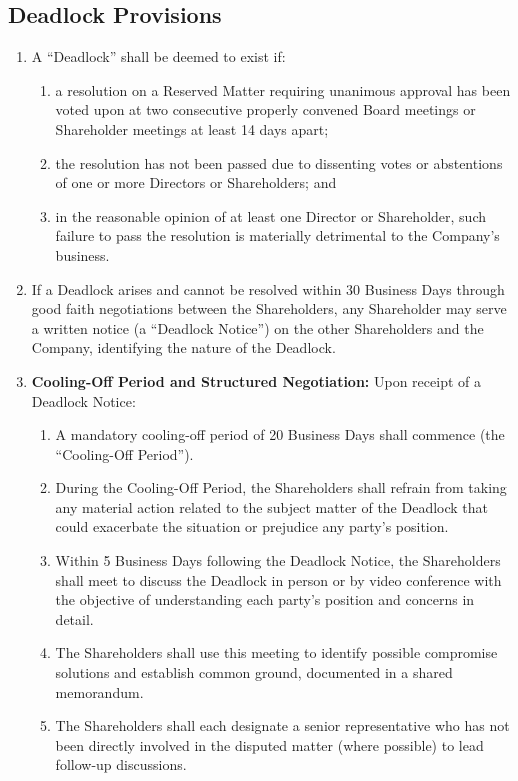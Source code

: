 \subsection{Deadlock Provisions} \label{subsec:DeadlockResolution}
\begin{enumerate}[label=(\alph*)]
\item A ``Deadlock'' shall be deemed to exist if:
    \begin{enumerate}[label=(\roman*)]
    \item a resolution on a Reserved Matter requiring unanimous approval has been voted upon at two consecutive properly convened Board meetings or Shareholder meetings at least 14 days apart;
    \item the resolution has not been passed due to dissenting votes or abstentions of one or more Directors or Shareholders; and
    \item in the reasonable opinion of at least one Director or Shareholder, such failure to pass the resolution is materially detrimental to the Company's business.
    \end{enumerate}
\item If a Deadlock arises and cannot be resolved within 30 Business Days through good faith negotiations between the Shareholders, any Shareholder may serve a written notice (a ``Deadlock Notice'') on the other Shareholders and the Company, identifying the nature of the Deadlock.
\item \textbf{Cooling-Off Period and Structured Negotiation:} Upon receipt of a Deadlock Notice:
    \begin{enumerate}[label=(\roman*)]
    \item A mandatory cooling-off period of 20 Business Days shall commence (the ``Cooling-Off Period'').
    \item During the Cooling-Off Period, the Shareholders shall refrain from taking any material action related to the subject matter of the Deadlock that could exacerbate the situation or prejudice any party's position.
    \item Within 5 Business Days following the Deadlock Notice, the Shareholders shall meet to discuss the Deadlock in person or by video conference with the objective of understanding each party's position and concerns in detail.
    \item The Shareholders shall use this meeting to identify possible compromise solutions and establish common ground, documented in a shared memorandum.
    \item The Shareholders shall each designate a senior representative who has not been directly involved in the disputed matter (where possible) to lead follow-up discussions.

\end{enumerate}
\end{enumerate}
